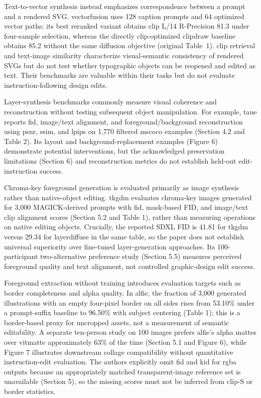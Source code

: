 Text-to-vector synthesis instead emphasizes correspondence between a prompt and a rendered SVG.
\ac{vectorfusion} uses 128 caption prompts and 64 optimized vector paths; its best reranked variant obtains \ac{clip} L/14 R-Precision 81.3 under four-sample selection, whereas the directly \ac{clip}-optimized \ac{clipdraw} baseline obtains 85.2 without the same diffusion objective (original Table~1).
\ac{clip} retrieval and text-image similarity characterize visual-semantic consistency of rendered SVGs but do not test whether typographic objects can be reopened and edited as text.
Their benchmarks are valuable within their tasks but do not evaluate instruction-following design edits.

Layer-synthesis benchmarks commonly measure visual coherence and reconstruction without testing subsequent object manipulation.
For example, \ac{taue} reports \ac{fid}, image/text alignment, and foreground/background reconstruction using \ac{psnr}, \ac{ssim}, and \ac{lpips} on 1,770 filtered \ac{mscoco} examples (Section 4.2 and Table 2).
Its layout and background-replacement examples (Figure 6) demonstrate potential interventions, but the acknowledged preservation limitations (Section 6) and reconstruction metrics do not establish held-out edit-instruction success.

Chroma-key foreground generation is evaluated primarily as image synthesis rather than native-object editing.
\ac{tkgdm} evaluates chroma-key images generated for 3,000 MAGICK-derived prompts with \ac{fid}, mask-based FID, and image/text \ac{clip} alignment scores (Section 5.2 and Table 1), rather than measuring operations on native editing objects.
Crucially, the reported SDXL FID is 41.81 for \ac{tkgdm} versus 29.34 for \ac{layerdiffuse} in the same table, so the paper does not establish universal superiority over fine-tuned layer-generation approaches.
Its 100-participant two-alternative preference study (Section 5.5) measures perceived foreground quality and text alignment, not controlled graphic-design edit success.

Foreground extraction without training introduces evaluation targets such as border completeness and alpha quality.
In \ac{alfie}, the fraction of 3,000 generated illustrations with an empty four-pixel border on all sides rises from 53.10\% under a prompt-suffix baseline to 96.50\% with subject centering (Table 1); this is a border-based proxy for uncropped assets, not a measurement of semantic editability.
A separate ten-person study on 100 images prefers \ac{alfie}'s alpha mattes over \ac{vitmatte} approximately 63\% of the time (Section 5.1 and Figure 6), while Figure 7 illustrates downstream collage compatibility without quantitative instruction-edit evaluation.
The authors explicitly omit \ac{fid} and \ac{kid} for \ac{rgba} outputs because an appropriately matched transparent-image reference set is unavailable (Section 5), so the missing scores must not be inferred from \ac{clip}-S or border statistics.

